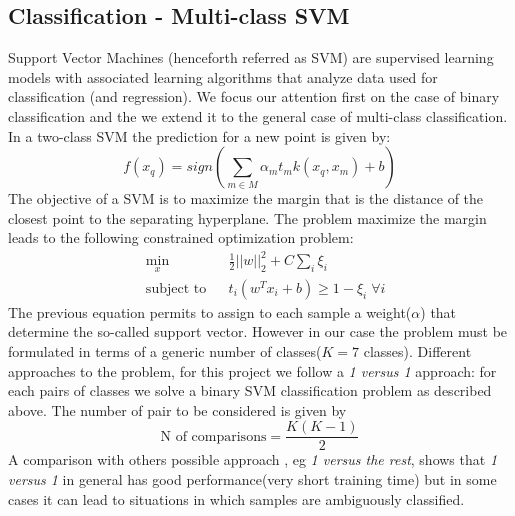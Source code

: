 \documentclass[a4paper,10pt]{article}
\begin{document}
  \subsection{Classification - Multi-class SVM}
     Support Vector Machines (henceforth referred as SVM) are supervised learning models with associated learning algorithms
     that analyze data used for classification (and regression).\newline
     We focus our attention first on the case of binary classification and the we extend it to the general case of multi-class classification.\newline
     In a two-class SVM the prediction for a new point is given by:
     \begin{equation}
      f(x_q) = sign \left( \sum_{m \in M} \alpha_m t_m k(x_q, x_m) + b \right ) 
     \end{equation}
     The objective of a SVM is to maximize the margin that is the distance of the closest point to the separating hyperplane.
     The problem maximize the margin leads to the following constrained optimization problem:
     \begin{equation}
      \begin{aligned}
	& \underset{x}{\text{min}}
	& & \frac{1}{2} ||w||_2^2 + C \sum_{i} \xi_i  \\
	& \text{subject to}
	& & t_i(w^T x_i + b) \geq 1 - \xi_i \; \forall i
      \end{aligned}
     \end{equation}
     The previous equation permits to assign to each sample a weight($\alpha$) that determine the so-called support vector.\newline
     However in our case the problem must be formulated in terms of a generic number of classes($K=7$ classes).\newline
     Different approaches to the problem, for this project we follow a \textit{1 versus 1} approach: for each pairs of classes
     we solve a binary SVM classification problem as described above. The number of pair to be considered is given by
     \begin{equation}
      \textrm{N of comparisons} = \frac{K(K-1)}{2}
     \end{equation}
     A comparison with others possible approach \cite{multisvm}, eg \textit{1 versus the rest}, shows that \textit{1 versus 1}
     in general has good performance(very short training time) but in some cases it can lead to situations in which samples are
     ambiguously classified.
\end{document}
